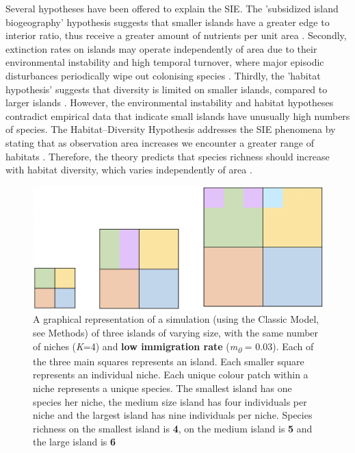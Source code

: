 \noindent Several hypotheses have been offered to explain the SIE. The 'subsidized island biogeography' hypothesis suggests that smaller islands have a greater edge to interior ratio, thus receive a greater amount of nutrients per unit area \cite{barrett2003small} \cite{anderson2001subsidized}. Secondly, extinction rates on islands may operate independently of area due to their environmental instability and high temporal turnover, where major episodic disturbances periodically wipe out colonising species \cite{MacArthurRobertH1967Ttoi}. Thirdly, the 'habitat hypothesis' suggests that diversity is limited on smaller islands, compared to larger islands \cite{triantis2008evolutionary}. However, the environmental instability and habitat hypotheses contradict empirical data that indicate small islands have unusually high numbers of species. The Habitat--Diversity Hypothesis addresses the SIE phenomena by stating that as observation area increases we encounter a greater range of habitats \cite{EdwardF.Connor1979TSaB}. Therefore, the theory predicts that species richness should increase with habitat diversity, which varies independently of area \cite{macdonald2018theory}.  \\

\begin{figure}[htp]

\centering
\includegraphics[width=.5\textwidth]{LowImIslands.png}\hfill

\caption{A graphical representation of a simulation (using the Classic Model, see Methods) of three islands of varying size, with the same number of niches (\textit{K}=4) and \textbf{low immigration rate} (\textit{m\textsubscript{0}} = 0.03). Each of the three main squares represents an island. Each smaller square represents an individual niche. Each unique colour patch within a niche represents a unique species. The smallest island has one species her niche, the medium size island has four individuals per niche and the largest island has nine individuals per niche. Species richness on the smallest island is \textbf{4}, on the medium island is \textbf{5} and the large island is \textbf{6}}
\label{fig:figure2}

\end{figure}

